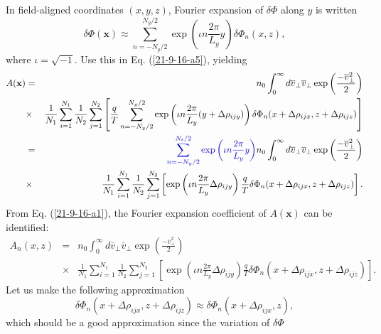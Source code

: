 \documentclass{llncs}
\newcommand{\tmcolor}[2]{{\color{#1}{#2}}}
\begin{document}
In field-aligned coordinates $(x, y, z)$, Fourier expansion of $\delta \Phi$
along $y$ is written
\begin{equation}
  \delta \Phi (\mathbf{x}) \approx \sum_{n = - N_y / 2}^{N_y / 2} \exp \left(
  \iota n \frac{2 \pi}{L_y} y \right) \delta \Phi_n (x, z),
\end{equation}
where $\iota = \sqrt{- 1}$. Use this in Eq. (\ref{21-9-16-a5}), yielding
\begin{eqnarray}
  A (\mathbf{x}) & = & n_0  \int_0^{\infty} d \overline{v}_{\perp}
  \overline{v}_{\perp} \exp \left( \frac{- \overline{v}^2_{\perp}}{2} \right)
  \nonumber\\
  & \times & \frac{1}{N_1} \sum_{i = 1}^{N_1} \frac{1}{N_2}  \sum_{j =
  1}^{N_2} \left[ \frac{q}{T}  \sum_{n = - N_y / 2}^{N_y / 2} \exp \left(
  \iota n \frac{2 \pi}{L_y} (y + \Delta \rho_{i j y}) \right) \delta \Phi_n (x
  + \Delta \rho_{i j x}, z + \Delta \rho_{i j z}) \right] \nonumber\\
  & = &  \tmcolor{blue}{\sum_{n = - N_y / 2}^{N_t / 2} \exp \left( \iota n
  \frac{2 \pi}{L_y} y \right)} n_0 \int_0^{\infty} d \overline{v}_{\perp}
  \overline{v}_{\perp} \exp \left( \frac{- \overline{v}^2_{\perp}}{2} \right)
  \nonumber\\
  & \times & \frac{1}{N_1} \sum_{i = 1}^{N_1} \frac{1}{N_2}  \sum_{j =
  1}^{N_2} \left[ \exp \left( \iota n \frac{2 \pi}{L_y} \Delta \rho_{i j y}
  \right) \frac{q}{T} \delta \Phi_n (x + \Delta \rho_{i j x}, z + \Delta
  \rho_{i j z}) \right] .  \label{21-9-16-a1}
\end{eqnarray}
From Eq. (\ref{21-9-16-a1}), the Fourier expansion coefficient of $A
(\mathbf{x})$ can be identified:
\begin{eqnarray}
  A_n (x, z) & = & n_0  \int_0^{\infty} d \overline{v}_{\perp}
  \overline{v}_{\perp} \exp \left( \frac{- \overline{v}^2_{\perp}}{2} \right)
  \nonumber\\
  & \times & \frac{1}{N_1} \sum_{i = 1}^{N_1} \frac{1}{N_2}  \sum_{j =
  1}^{N_2} \left[ \exp \left( \iota n \frac{2 \pi}{L_y} \Delta \rho_{i j y}
  \right) \frac{q}{T} \delta \Phi_n (x + \Delta \rho_{i j x}, z + \Delta
  \rho_{i j z}) \right] .  \label{22-12-21-1}
\end{eqnarray}
Let us make the following approximation
\begin{equation}
  \label{22-12-21-3} \delta \Phi_n (x + \Delta \rho_{i j x}, z + \Delta
  \rho_{i j z}) \approx \delta \Phi_n (x + \Delta \rho_{i j x}, z),
\end{equation}
which should be a good approximation since the variation of $\delta \Phi$
\end{document}
